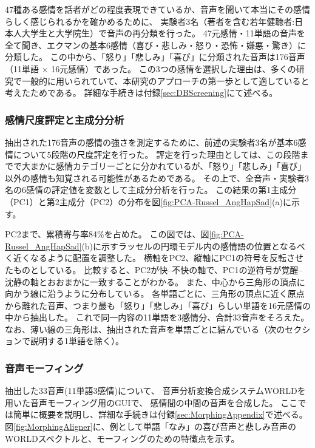 47種ある感情を話者がどの程度表現できているか、音声を聞いて本当にその感情らしく感じられるかを確かめるために、
実験者3名（著者を含む若年健聴者:日本人大学生と大学院生）で音声の再分類を行った。
47元感情・11単語の音声を全て聞き、エクマンの基本6感情（喜び・悲しみ・怒り・恐怖・嫌悪・驚き）\cite{ekman1992argument}に分類した。
この中から、「怒り」「悲しみ」「喜び」に分類された音声は176音声（11単語 $\times$ 16元感情）であった。
この3つの感情を選択した理由は、多くの研究で一般的に用いられていて、本研究のアプローチの第一歩として適していると考えたためである。
詳細な手続きは付録\ref{sec:DBScreening}にて述べる。

\newpage


\subsubsection{感情尺度評定と主成分分析}
抽出された176音声の感情の強さを測定するために、前述の実験者3名が基本6感情について5段階の尺度評定を行った。
評定を行った理由としては、この段階までで大まかに感情カテゴリーごとに分かれているが、「怒り」「悲しみ」「喜び」以外の感情も知覚される可能性があるためである。
その上で、全音声・実験者3名の6感情の評定値を変数として主成分分析を行った。
この結果の第1主成分（PC1）と第2主成分（PC2）の分布を図\ref{fig:PCA-Russel_AngHapSad}(a)に示す。

PC2まで、累積寄与率84\%を占めた。
この図では、図\ref{fig:PCA-Russel_AngHapSad}(b)に示すラッセルの円環モデル\cite{russell1980circumplex}内の感情語の位置となるべく近くなるように配置を調整した。
横軸をPC2、縦軸にPC1の符号を反転させたものとしている。
比較すると、PC2が快--不快の軸で、PC1の逆符号が覚醒--沈静の軸とおおまかに一致することがわかる。
また、中心から三角形の頂点に向かう線に沿うように分布している。
各単語ごとに、三角形の頂点に近く原点から離れた音声、つまり最も「怒り」「悲しみ」「喜び」らしい単語を16元感情の中から抽出した。
これで同一内容の11単語を3感情分、合計33音声をそろえた。
なお、薄い線の三角形は、抽出された音声を単語ごとに結んでいる（次のセクションで説明する1単語を除く）。





\subsubsection{音声モーフィング}
\label{sec:morphAngSadHap}

抽出した33音声(11単語\time 3感情)について、
音声分析変換合成システムWORLD\cite{morise2016world}を用いた音声モーフィング用のGUI\cite{kawahara2024interactive}で、
感情間の中間の音声を合成した。
ここでは簡単に概要を説明し、詳細な手続きは付録\ref{sec:MorphingAppendix}で述べる。
図\ref{fig:MorphingAligner}に、例として単語「なみ」の喜び音声と悲しみ音声のWORLDスペクトルと、モーフィングのための特徴点を示す。

